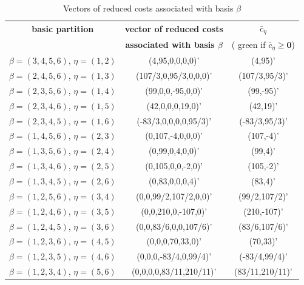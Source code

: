 \begin{table}[!h]
\centering
\footnotesize
\begin{tabular}{|c|c|c|}\hline

\textbf{basic partition} & \textbf{vector of reduced costs} & $\bar{c}_\eta $ \\
& \textbf{associated with basis $\beta$} & ({\color{green} green} if $\bar{c}_\eta \geq \mathbf 0$)\\
\hline\hline
$\beta = (3,4,5,6) $, $\eta = (1,2)$ & (4,95,0,0,0,0)' & {\color{green}(4,95)'}\\\hline
$\beta = (2,4,5,6) $, $\eta = (1,3)$ & (107/3,0,95/3,0,0,0)' & {\color{green}(107/3,95/3)'}\\\hline
$\beta = (2,3,5,6) $, $\eta = (1,4)$ & (99,0,0,-95,0,0)' & (99,-95)'\\\hline
$\beta = (2,3,4,6) $, $\eta = (1,5)$ & (42,0,0,0,19,0)' & {\color{green}(42,19)'}\\\hline
$\beta = (2,3,4,5) $, $\eta = (1,6)$ & (-83/3,0,0,0,0,95/3)' & (-83/3,95/3)' \\\hline
$\beta = (1,4,5,6) $, $\eta = (2,3)$ & (0,107,-4,0,0,0)' & (107,-4)'\\\hline
$\beta = (1,3,5,6) $, $\eta = (2,4)$ & (0,99,0,4,0,0)' & {\color{green}(99,4)'}\\\hline
$\beta = (1,3,4,6) $, $\eta = (2,5)$ & (0,105,0,0,-2,0)' & (105,-2)'\\\hline
$\beta = (1,3,4,5) $, $\eta = (2,6)$ & (0,83,0,0,0,4)' & {\color{green}(83,4)'}\\\hline
$\beta = (1,2,5,6) $, $\eta = (3,4)$ & (0,0,99/2,107/2,0,0)' & {\color{green}(99/2,107/2)'} \\\hline
$\beta = (1,2,4,6) $, $\eta = (3,5)$ & (0,0,210,0,-107,0)' & (210,-107)' \\\hline
$\beta = (1,2,4,5) $, $\eta = (3,6)$ & (0,0,83/6,0,0,107/6)' & {\color{green}(83/6,107/6)'} \\\hline
$\beta = (1,2,3,6) $, $\eta = (4,5)$ & (0,0,0,70,33,0)' & {\color{green}(70,33)'} \\\hline
$\beta = (1,2,3,5) $, $\eta = (4,6)$ & (0,0,0,-83/4,0,99/4)' & (-83/4,99/4)' \\\hline
$\beta = (1,2,3,4) $, $\eta = (5,6)$ & (0,0,0,0,83/11,210/11)' & {\color{green}(83/11,210/11)'}\\\hline

\end{tabular}
\caption{Vectors of reduced costs associated with basis $\beta$}
\label{tab:vector-cost}
\end{table}

